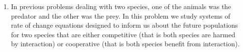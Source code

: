 \begin{enumerate}
\begin{center}
\end{center}

\clearpage

\item In previous problems dealing with two species, one of the animals was the predator and the other was the prey. In this problem we study systems of rate of change equations designed to inform us about the future populations for two species that are either competitive (that is both species are harmed by interaction) or cooperative (that is both species benefit from interaction). \label{09HWproblem5}


\end{enumerate}
